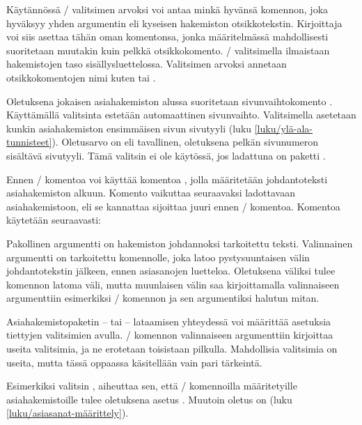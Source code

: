 Käytännössä \-/ valitsimen arvoksi voi antaa minkä hyvänsä
komennon, joka hyväksyy yhden argumentin eli kyseisen hakemiston
otsikkotekstin. Kirjoittaja voi siis asettaa tähän oman komentonsa,
jonka määritelmässä mahdollisesti suoritetaan muutakin kuin pelkkä
otsikkokomento. \-/ valitsimella ilmaistaan hakemistojen
taso sisällysluettelossa. Valitsimen arvoksi annetaan otsikkokomentojen
nimi kuten  tai .

Oletuksena jokaisen asiahakemiston alussa suoritetaan sivunvaihtokomento
. Käyttämällä valitsinta  estetään
automaattinen sivunvaihto. Valitsimella  asetetaan
kunkin asiahakemiston ensimmäisen sivun sivutyyli (luku
\ref{luku/ylä-ala-tunnisteet}). Oletusarvo on  eli
tavallinen, oletuksena pelkän sivunumeron sisältävä sivutyyli. Tämä
valitsin ei ole käytössä, jos ladattuna on paketti .

Ennen \-/ komentoa voi käyttää komentoa
, jolla määritetään johdantoteksti asiahakemiston
alkuun. Komento vaikuttaa seuraavaksi ladottavaan asiahakemistoon, eli
se kannattaa sijoittaa juuri ennen \-/ komentoa.
Komentoa käytetään seuraavasti:

\begin{koodilohkosis}
\end{koodilohkosis}

\noindent
Pakollinen argumentti  on hakemiston johdannoksi
tarkoitettu teksti. Valinnainen argumentti  on tarkoitettu
komennolle, joka latoo pystysuuntaisen välin johdantotekstin jälkeen,
ennen asiasanojen luetteloa. Oletuksena väliksi tulee komennon
 latoma väli, mutta muunlaisen välin saa kirjoittamalla
valinnaiseen argumenttiin esimerkiksi \-/ komennon ja
sen argumentiksi halutun mitan.

Asiahakemistopaketin --  tai  --
lataamisen yhteydessä voi määrittää asetuksia tiettyjen valitsimien
avulla. \-/ komennon valinnaiseen argumenttiin
kirjoittaa useita valitsimia, ja ne erotetaan toisistaan pilkulla.
Mahdollisia valitsimia on useita, mutta tässä oppaassa käsitellään vain
pari tärkeintä.

Esimerkiksi valitsin , aiheuttaa sen, että
\-/ komennoilla määritetyille asiahakemistoille tulee
oletuksena asetus . Muutoin oletus on
 (luku \ref{luku/asiasanat-määrittely}).

